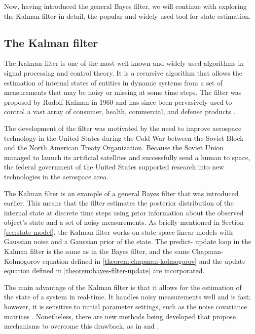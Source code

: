Now, having introduced the general Bayes filter, we will continue with 
exploring the Kalman filter in detail, the popular and widely used tool for 
state estimation.

\subsection{The Kalman filter}

The Kalman filter is one of the most well-known and widely used algorithms in 
signal processing and control theory. It is a recursive algorithm that allows 
the estimation of internal states of entities in dynamic systems from a set of 
measurements that may be noisy or missing at some time steps. The filter was 
proposed by Rudolf Kalman in 1960 \cite{kalmanNewApproachLinear1960} and has 
since been pervasively used to control a vast array of consumer, health, 
commercial, and defense products \cite{grewalApplicationsKalmanFiltering2010}.

The development of the filter was motivated by the need to improve aerospace 
technology in the United States during the Cold War between the Soviet Block 
and the North American Treaty Organization. Because the Soviet Union managed to 
launch its artificial satellites and successfully send a human to space, the 
federal government of the United States supported research into new 
technologies in the aerospace area.

The Kalman filter is an example of a general Bayes filter that was introduced 
earlier. This means that the filter estimates the posterior distribution of the 
internal state at discrete time steps using prior information about the 
observed object's state and a set of noisy measurements. As briefly mentioned 
in Section \ref{sec:state-model}, the Kalman filter works on state-space linear 
models with Gaussian noise and a Gaussian prior of the state. The predict-
update loop in the Kalman filter is the same as in the Bayes filter, and the 
same Chapman-Kolmogorov equation defined in \ref{theorem:chapman-kolmogorov} 
and the update equation defined in \ref{theorem:bayes-filter-update} are 
incorporated.

The main advantage of the Kalman filter is that it allows for the estimation of 
the state of a system in real-time. It handles noisy measurements well and is 
fast; however, it is sensitive to initial parameter settings, such as the noise 
covariance matrices \cite{gePerformanceAnalysisKalman2016}. Nonetheless, there 
are new methods being developed that propose mechanisms to overcome this 
drawback, as in \cite{matiskoNoiseCovariancesEstimation2010} and 
\cite{yuenOnlineEstimationNoise2013}.

